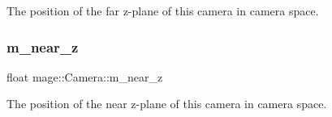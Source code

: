 The position of the far z-\/plane of this camera in camera space. \hypertarget{classmage_1_1_camera_a685f8700a29d1f1eff2bec353c3ec970}{}\label{classmage_1_1_camera_a685f8700a29d1f1eff2bec353c3ec970} 
\subsubsection{\texorpdfstring{m\+\_\+near\+\_\+z}{m\_near\_z}}
{\footnotesize\ttfamily float mage\+::\+Camera\+::m\+\_\+near\+\_\+z\hspace{0.3cm}{\ttfamily [private]}}

The position of the near z-\/plane of this camera in camera space. 